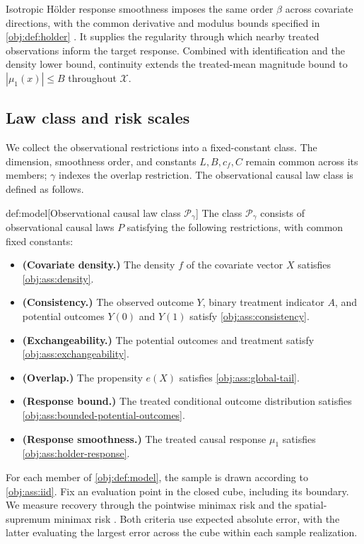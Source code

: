 Isotropic Hölder response smoothness imposes the same order \(\beta\) across covariate directions, with the common derivative and modulus bounds specified in \cref{obj:def:holder} \citep{Dorn2026GlobalOverlap}. It supplies the regularity through which nearby treated observations inform the target response. Combined with identification and the density lower bound, continuity extends the treated-mean magnitude bound to \(|\mu_1(x)|\le B\) throughout \(\mathcal X\).

\subsection{Law class and risk scales}

We collect the observational restrictions into a fixed-constant class. The dimension, smoothness order, and constants \(L,B,c_f,C\) remain common across its members; \(\gamma\) indexes the overlap restriction. The observational causal law class  is defined as follows.

\begin{definitionv}{def:model}[Observational causal law class $\mathcal P_\gamma$]
The class \(\mathcal P_\gamma\) consists of observational causal laws \(P\) satisfying the following restrictions, with common fixed constants:
\begin{itemize}
\item \textbf{(Covariate density.)} The density \(f\) of the covariate vector \(X\) satisfies \cref{obj:ass:density}.
\item \textbf{(Consistency.)} The observed outcome \(Y\), binary treatment indicator \(A\), and potential outcomes \(Y(0)\) and \(Y(1)\) satisfy \cref{obj:ass:consistency}.
\item \textbf{(Exchangeability.)} The potential outcomes and treatment satisfy \cref{obj:ass:exchangeability}.
\item \textbf{(Overlap.)} The propensity \(e(X)\) satisfies \cref{obj:ass:global-tail}.
\item \textbf{(Response bound.)} The treated conditional outcome distribution satisfies \cref{obj:ass:bounded-potential-outcomes}.
\item \textbf{(Response smoothness.)} The treated causal response \(\mu_1\) satisfies \cref{obj:ass:holder-response}.
\end{itemize}
\end{definitionv}

For each member of \cref{obj:def:model}, the sample is drawn according to \cref{obj:ass:iid}. Fix an evaluation point  in the closed cube, including its boundary. We measure recovery through the pointwise minimax risk  and the spatial-supremum minimax risk . Both criteria use expected absolute error, with the latter evaluating the largest error across the cube within each sample realization.

